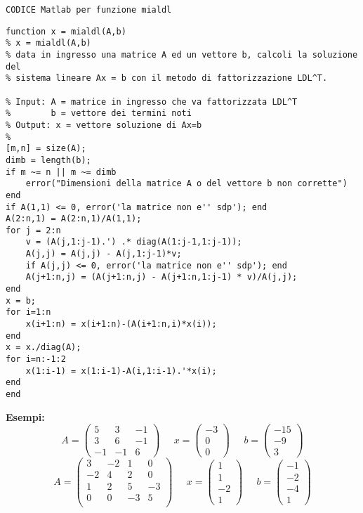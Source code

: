\documentclass[12pt]{article}
\begin{document}
\texttt{CODICE Matlab per funzione mialdl}
\begin{lstlisting}[frame=single]
function x = mialdl(A,b)
% x = mialdl(A,b)
% data in ingresso una matrice A ed un vettore b, calcoli la soluzione del 
% sistema lineare Ax = b con il metodo di fattorizzazione LDL^T.

% Input: A = matrice in ingresso che va fattorizzata LDL^T
%        b = vettore dei termini noti
% Output: x = vettore soluzione di Ax=b
%
[m,n] = size(A);
dimb = length(b);
if m ~= n || m ~= dimb
    error("Dimensioni della matrice A o del vettore b non corrette")
end
if A(1,1) <= 0, error('la matrice non e'' sdp'); end
A(2:n,1) = A(2:n,1)/A(1,1);
for j = 2:n
    v = (A(j,1:j-1).') .* diag(A(1:j-1,1:j-1));
    A(j,j) = A(j,j) - A(j,1:j-1)*v;
    if A(j,j) <= 0, error('la matrice non e'' sdp'); end
    A(j+1:n,j) = (A(j+1:n,j) - A(j+1:n,1:j-1) * v)/A(j,j);
end
x = b;
for i=1:n
    x(i+1:n) = x(i+1:n)-(A(i+1:n,i)*x(i));
end
x = x./diag(A);
for i=n:-1:2
    x(1:i-1) = x(1:i-1)-A(i,1:i-1).'*x(i);
end 
end
\end{lstlisting}
\textbf{Esempi:}
\begin{equation}A=
    \begin{pmatrix}
        5 & 3 & -1 \\
        3 & 6 & -1 \\
        -1 & -1 & 6 
    \end{pmatrix}\;\;\;\;\;x=
    \begin{pmatrix}
        -3 \\
        0\\
        0  
    \end{pmatrix}\;\;\;\;\;b=
    \begin{pmatrix}
        -15 \\
        -9 \\
        3  
    \end{pmatrix}
\end{equation}
\begin{equation}
    A=
    \begin{pmatrix}
        3 & -2 & 1 & 0 \\
        -2 & 4 & 2 & 0 \\
        1 & 2 & 5 & -3 \\
        0 & 0 & -3 & 5 \\
    \end{pmatrix}\;\;\;\;\;x=
    \begin{pmatrix}
        1 \\
        1 \\
        -2 \\
        1 
    \end{pmatrix}\;\;\;\;\;b=
    \begin{pmatrix}
        -1 \\
        -2 \\
        -4 \\
        1 
    \end{pmatrix}
\end{equation}
\end{document}

